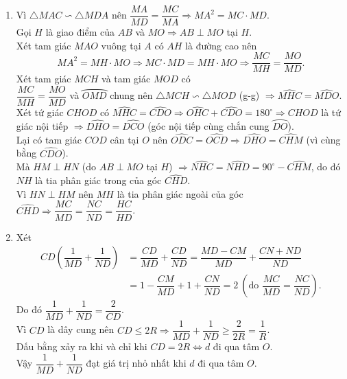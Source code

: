 \begin{ex}
{\begin{enumerate}
Xét tam giác $ AMC $ và tam giác $ DMA $ có $ \widehat{AMD}$ chung và $ \widehat{MAC}=\widehat{MDA} $ (góc nội tiếp và góc tạo bởi tiếp tuyến và dây cung cùng chắn cung $ \wideparen{AC} $), do đó $ \triangle MAC\backsim\triangle MDA $ (g-g).
\item Vì $ \triangle MAC\backsim\triangle MDA $ nên $ \dfrac{MA}{MD}=\dfrac{MC}{MA}\Rightarrow MA^{2}=MC\cdot MD $.\\
Gọi $ H $ là giao điểm của $ AB $ và $ MO\Rightarrow AB\perp MO $ tại $ H $.\\
Xét tam giác $ MAO $ vuông tại $ A $ có $ AH $ là đường cao nên
\[ 
MA^{2}=MH\cdot MO\Rightarrow MC\cdot MD=MH\cdot MO\Rightarrow \dfrac{MC}{MH}=\dfrac{MO}{MD}.
\]
Xét tam giác $ MCH $ và tam giác $ MOD $ có\\
$ \dfrac{MC}{MH}=\dfrac{MO}{MD} $ và $ \wideparen{OMD} $ chung nên $\triangle MCH\backsim\triangle MOD $ (g-g) $ \Rightarrow \widehat{MHC}=\widehat{MDO} $.\\
Xét tứ giác $ CHOD $ có $ \widehat{MHC}=\widehat{CDO}\Rightarrow \widehat{OHC}+\widehat{CDO}=180^{\circ}\Rightarrow CHOD $ là tứ giác nội tiếp $ \Rightarrow \widehat{DHO}=\widehat{DCO} $ (góc nội tiếp cùng chắn cung $ \wideparen{DO} $).\\
Lại có tam giác $ COD $ cân tại $ O $ nên $ \widehat{ODC}=\widehat{OCD}\Rightarrow \widehat{DHO}=\widehat{CHM}$ (vì cùng bằng $\widehat{CDO} $).\\
Mà $ HM\perp HN$ (do $ AB\perp MO $ tại $ H $) $\Rightarrow \widehat{NHC}=\widehat{NHD}=90^{\circ}-\widehat{CHM} $, do đó $ NH $ là tia phân giác trong của góc $ \widehat{CHD} $.\\
Vì $ HN\perp HM $ nên $ MH $ là tia phân giác ngoài của góc $ \widehat{CHD}\Rightarrow \dfrac{MC}{MD}=\dfrac{NC}{ND}=\dfrac{HC}{HD} $.
\item Xét 
\begin{align*}
CD\left(\dfrac{1}{MD}+\dfrac{1}{ND}\right)&=\dfrac{CD}{MD}+\dfrac{CD}{ND}=\dfrac{MD-CM}{MD}+\dfrac{CN+ND}{ND}\\
&=1-\dfrac{CM}{MD}+1+\dfrac{CN}{ND}=2\ \left(\text{do }\dfrac{MC}{MD}=\dfrac{NC}{ND}\right).
\end{align*}
Do đó $\dfrac{1}{MD}+\dfrac{1}{ND}=\dfrac{2}{CD}$.\\ 
Vì $ CD $ là dây cung nên $ CD\leq 2R\Rightarrow \dfrac{1}{MD}+\dfrac{1}{ND}\geq\dfrac{2}{2R}=\dfrac{1}{R} $.\\
Dấu bằng xảy ra khi và chỉ khi $ CD=2R\Leftrightarrow d $ đi qua tâm $ O $.\\
Vậy $ \dfrac{1}{MD}+\dfrac{1}{ND} $ đạt giá trị nhỏ nhất khi $ d $ đi qua tâm $ O $.
\end{enumerate}
}
\end{ex}
